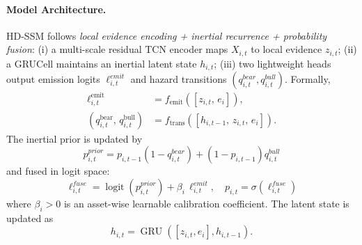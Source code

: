 \documentclass[letterpaper]{article} %
\begin{document}
\paragraph{Model Architecture.} 
HD-SSM follows \emph{local evidence encoding + inertial recurrence + probability fusion}:
(i) a multi-scale residual TCN encoder maps $X_{i,t}$ to local evidence $z_{i,t}$;
(ii) a GRUCell maintains an inertial latent state $h_{i,t}$;
(iii) two lightweight heads output emission logits $\ell^{emit}_{i,t}$ and hazard transitions
$(q^{bear}_{i,t},q^{bull}_{i,t})$.
Formally,
\begin{equation}
\begin{aligned}
\ell^{\mathrm{emit}}_{i,t} &= f_{\mathrm{emit}}\!\left([z_{i,t},\,e_i]\right),\\
\left(q^{\mathrm{bear}}_{i,t},\,q^{\mathrm{bull}}_{i,t}\right)
&= f_{\mathrm{trans}}\!\left([h_{i,t-1},\,z_{i,t},\,e_i]\right).
\end{aligned}
\end{equation}
The inertial prior is updated by
\begin{equation}
p^{prior}_{i,t}=p_{i,t-1}(1-q^{bear}_{i,t})+(1-p_{i,t-1})q^{bull}_{i,t}
\end{equation}
and fused in logit space:
\begin{equation}
\ell^{fuse}_{i,t}=\operatorname{logit}(p^{prior}_{i,t})+\beta_i\,\ell^{emit}_{i,t}, \quad
p_{i,t}=\sigma(\ell^{fuse}_{i,t})
\end{equation}
where $\beta_i>0$ is an asset-wise learnable calibration coefficient.
The latent state is updated as
\begin{equation}
h_{i,t}=\operatorname{GRU}([z_{i,t},e_i],h_{i,t-1}).
\end{equation}
\end{document}
